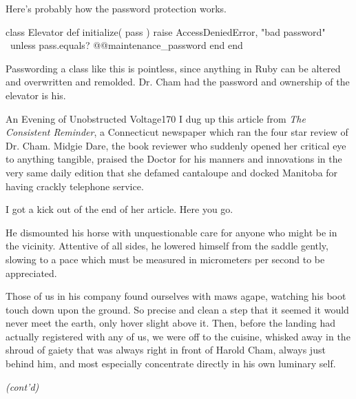\documentclass[12pt,twoside]{report}
\begin{document}
Here's probably how the password protection works.


\begin{rubycode}

 class Elevator
   def initialize( pass )
     raise AccessDeniedError, "bad password" \
       unless pass.equals? @@maintenance_password
   end
 end

\end{rubycode}


Passwording a class like this is pointless, since anything in Ruby can
be altered and overwritten and remolded.  Dr. Cham had the password
and ownership of the elevator is his.

\pagebreak

	\begin{sidebar}{An Evening of Unobstructed Voltage}{170}
		I dug up this article from \textit{The Consistent Reminder}, a Connecticut newspaper which ran the four star review of Dr. Cham. Midgie Dare, the book reviewer who suddenly opened her critical eye to anything tangible, praised the Doctor for his manners and innovations in the very same daily edition that she defamed cantaloupe and docked Manitoba for having crackly telephone service.\vspace{6pt}
		
		I got a kick out of the end of her article. Here you go.\vspace{6pt}
		
		\vspace*{-6pt}
		\begin{quoting}[rightmargin=0pt,leftmargin=0.5\leftmargin,font=itshape]
			He dismounted his horse with unquestionable care for anyone who might be in the vicinity. Attentive of all sides, he lowered himself from the saddle gently, slowing to a pace which must be measured in micrometers per second to be appreciated.\vspace{6pt}
			
			Those of us in his company found ourselves with maws agape, watching his boot touch down upon the ground. So precise and clean a step that it seemed it would never meet the earth, only hover slight above it. Then, before the landing had actually registered with any of us, we were off to the cuisine, whisked away in the shroud of gaiety that was always right in front of Harold Cham, always just behind him, and most especially concentrate directly in his own luminary self.
		\end{quoting}
		\vspace*{-6pt}
		\textit{(cont'd)}\vspace{6pt}
	\end{sidebar}
\end{document}
